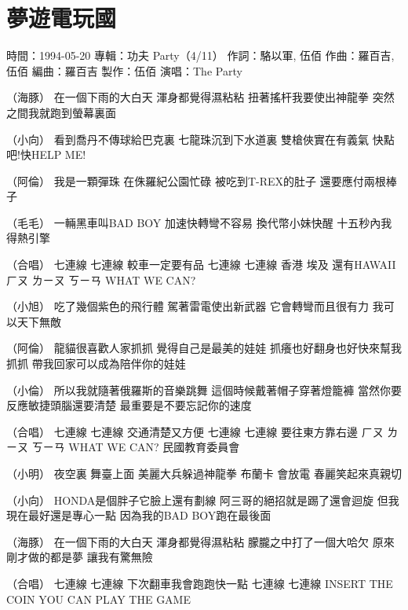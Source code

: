 \documentclass[UTF8,a4paper,oneside,twocolumn,12pt]{ctexbook}
\newcommand{\infopair}[2]{\textbullet #1：#2}
\newcommand{\zc}[1][伍佰]{\infopair{作詞}{#1}}
\newcommand{\zq}[1][伍佰]{\infopair{作曲}{#1}}
\newcommand{\bq}[1][伍佰]{\infopair{編曲}{#1}}
\newcommand{\zj}[1]{\infopair{專輯}{#1}}
\newcommand{\zz}[1]{\infopair{製作}{#1}}
\newcommand{\sj}[1]{\infopair{時間}{#1}}
\newenvironment{info}{\begin{flushleft}\kaishu
	}
	{\end{flushleft}\normalsize\yahei\par}
\newenvironment{lyric}{
	}
{}
\begin{document}
\section{夢遊電玩國}
\begin{info}
	\sj{1994-05-20}
	\zj{功夫 Party（4/11）}
	\zc[駱以軍, 伍佰]
	\zq[羅百吉, 伍佰]
	\bq[羅百吉]
	\zz{伍佰}
	\infopair{演唱}{The Party}
\end{info}
\begin{lyric}
	（海豚）
	在一個下雨的大白天 渾身都覺得濕粘粘
	扭著搖杆我要使出神龍拳
	突然之間我就跑到螢幕裏面

	（小向）
	看到喬丹不傳球給巴克裏 七龍珠沉到下水道裏
	雙槍俠實在有義氣 快點吧!快HELP ME!

	（阿倫）
	我是一顆彈珠 在侏羅紀公園忙碌
	被吃到T-REX的肚子 還要應付兩根棒子

	（毛毛）
	一輛黑車叫BAD BOY 加速快轉彎不容易
	換代幣小妹快醒 十五秒內我得熱引擎

	（合唱）
	七連線 七連線 較車一定要有品
	七連線 七連線 香港 埃及 還有HAWAII
	ㄏㄡ ㄌㄧㄡ ㄎㄧㄢ WHAT WE CAN?

	（小旭）
	吃了幾個紫色的飛行體 駕著雷電使出新武器
	它會轉彎而且很有力 我可以天下無敵

	（阿倫）
	龍貓很喜歡人家抓抓 覺得自己是最美的娃娃
	抓癢也好翻身也好快來幫我抓抓
	帶我回家可以成為陪伴你的娃娃

	（小倫）
	所以我就隨著俄羅斯的音樂跳舞
	這個時候戴著帽子穿著燈籠褲
	當然你要反應敏捷頭腦還要清楚
	最重要是不要忘記你的速度

	（合唱）
	七連線 七連線 交通清楚又方便
	七連線 七連線 要往東方靠右邊
	ㄏㄡ ㄌㄧㄡ ㄎㄧㄢ WHAT WE CAN?
	民國教育委員會

	（小明）
	夜空裏 舞臺上面 美麗大兵躲過神龍拳
	布蘭卡 會放電 春麗笑起來真親切

	（小向）
	HONDA是個胖子它臉上還有劃線
	阿三哥的絕招就是踢了還會迴旋
	但我現在最好還是專心一點 因為我的BAD BOY跑在最後面

	（海豚）
	在一個下雨的大白天 渾身都覺得濕粘粘
	朦朧之中打了一個大哈欠 原來剛才做的都是夢
	讓我有驚無險

	（合唱）
	七連線 七連線 下次翻車我會跑跑快一點
	七連線 七連線
	INSERT THE COIN YOU CAN PLAY THE GAME
\end{lyric}
\end{document}
